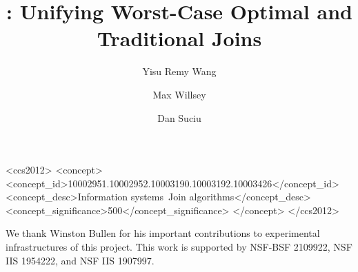 \documentclass[format=acmsmall, screen=true, review=false]{acmart}
\author{Yisu Remy Wang}
\affiliation{
  \institution{University of Washington}
  \country{USA}
}
\author{Max Willsey}
\affiliation{
  \institution{University of Washington}
  \country{USA}
}
\author{Dan Suciu}
\affiliation{
  \institution{University of Washington}
  \country{USA}
}
\begin{document}
\title{\FJ: Unifying Worst-Case Optimal and Traditional Joins}

\begin{abstract}
  
\end{abstract}

\begin{CCSXML}
  <ccs2012>
  <concept>
  <concept_id>10002951.10002952.10003190.10003192.10003426</concept_id>
  <concept_desc>Information systems~Join algorithms</concept_desc>
  <concept_significance>500</concept_significance>
  </concept>
  </ccs2012>
\end{CCSXML}
  

\maketitle







% 
% 


\begin{acks}
We thank Winston Bullen for his important contributions to 
 experimental infrastructures of this project.
This work is supported by 
  NSF-BSF 2109922, NSF IIS 1954222, and NSF IIS 1907997.
\end{acks}






% 
\end{document}
